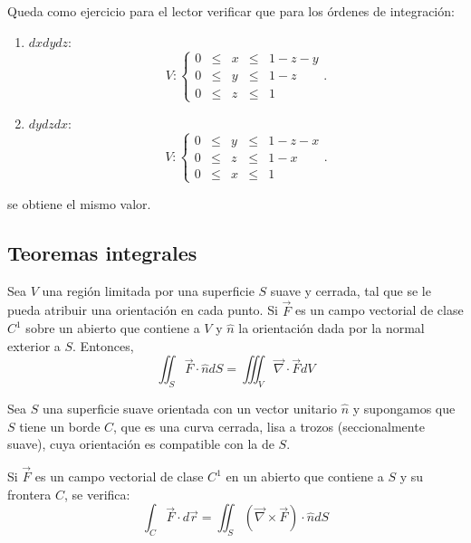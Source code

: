 \begin{ejemplo}
    Queda como ejercicio para el lector verificar que para los órdenes de integración:
    \begin{enumerate}
        \item $dxdydz$:
        $$V: \left\{ \begin{array}{ccccl}
             0 & \leq & x & \leq & 1-z-y  \\
             0 & \leq & y & \leq & 1-z \\
             0 & \leq & z & \leq & 1
        \end{array} \right. .$$

        \item $dydzdx$:
        $$V: \left\{ \begin{array}{ccccl}
             0 & \leq & y & \leq & 1-z-x  \\
             0 & \leq & z & \leq & 1-x \\
             0 & \leq & x & \leq &1
        \end{array} \right. .$$
    \end{enumerate}

    se obtiene el mismo valor.
\end{ejemplo}

\subsection{Teoremas integrales}

\begin{teorema}[de Gauss] \label{Gauss}
    Sea $V$ una región limitada por una superficie $S$ suave y cerrada, tal que se le pueda atribuir una orientación en cada punto. Si $\vec{F}$ es un campo vectorial de clase $C^1$ sobre un abierto que contiene a $V$ y $\hat{n}$ la orientación dada por la normal exterior a $S$. Entonces,
    \begin{equation*}
    \boxed{\iint_S \vec{F} \cdot \hat{n}dS = \iiint_V \vec{\nabla} \cdot \vec{F} dV} 
    \end{equation*}
\end{teorema}

\begin{teorema}[de Stokes] \label{Stokes}
    Sea $S$ una superficie suave orientada con un vector unitario $\hat{n}$ y supongamos que $S$ tiene un borde $C$, que es una curva cerrada, lisa a trozos (seccionalmente suave), cuya orientación es compatible con la de $S$.

    Si $\vec{F}$ es un campo vectorial de clase $C^1$ en un abierto que contiene a $S$ y su frontera $C$, se verifica:
    \begin{equation*}
    \boxed{\int_C \vec{F} \cdot d\vec{r} = \iint_S (\vec{\nabla} \times \vec{F}) \cdot \hat{n}dS}
    \end{equation*}
\end{teorema}

